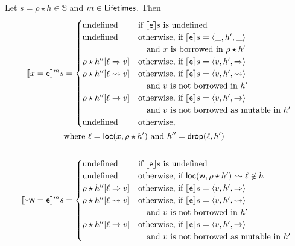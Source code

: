 \begin{definition}\label{def:semantics_terms}
  Let $s=\rho\star h\in\mathbb{S}$ and $m\in\Lifetimes$. Then
  \begin{align*}
    \denl[x=\mathsf{e}]{m}{s}&=
    \begin{cases}
      \text{undefined} & \text{if $\den[\mathsf{e}]{s}$ is undefined}\\
      \text{undefined} & \text{otherwise, if $\den[\mathsf{e}]{s}=\langle\_,h',\_\rangle$}\\
      & \quad\text{and $x$ is borrowed in $\rho\star h'$}\\
      \rho\star h''[\ell\Rightarrow v] & \text{otherwise, if $\den[\mathsf{e}]{s}=\langle v,h',\Rightarrow\rangle$}\\
      \rho\star h''[\ell\leadsto v] & \text{otherwise, if $\den[\mathsf{e}]{s}=\langle v,h',\leadsto\rangle$}\\
      & \quad\text{and $v$ is not borrowed in $h'$}\\
      \rho\star h''[\ell\to v] & \text{otherwise, if $\den[\mathsf{e}]{s}=\langle v,h',\to\rangle$}\\
      & \quad\text{and $v$ is not borrowed as mutable in $h'$}\\
      \text{undefined} & \text{otherwise,}
    \end{cases}\\
    &\text{where $\ell=\loc(x,\rho\star h')$ and $h''=\drop(\ell,h')$}\\
    \mbox{}\\
    \denl[*\mathsf{w}=\mathsf{e}]{m}{s}&=
    \begin{cases}
      \text{undefined} & \text{if $\den[\mathsf{e}]{s}$ is undefined}\\
      \text{undefined} & \text{otherwise, if $\loc(\mathsf{w},\rho\star h')\leadsto\ell\not\in h$}\\
      \rho\star h''[\ell\Rightarrow v] & \text{otherwise, if $\den[\mathsf{e}]{s}=\langle v,h',\Rightarrow\rangle$}\\
      \rho\star h''[\ell\leadsto v] & \text{otherwise, if $\den[\mathsf{e}]{s}=\langle v,h',\leadsto\rangle$}\\
      & \quad\text{and $v$ is not borrowed in $h'$}\\
      \rho\star h''[\ell\to v] & \text{otherwise, if $\den[\mathsf{e}]{s}=\langle v,h',\to\rangle$}\\
      &\quad\text{and $v$ is not borrowed as mutable in $h'$}\\

\end{cases}
\end{align*}
\end{definition}
